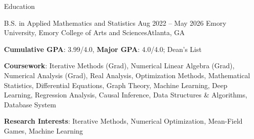 \documentclass[10pt, letterpaper]{resume} %
\begin{document}
 
\begin{rSection}{Education}
\begin{rSubsection}
	{B.S. in Applied Mathematics and Statistics}
	{Aug 2022 -- May 2026}
	{Emory University, Emory College of Arts and Sciences}{Atlanta, GA}
	
	\item \textbf{Cumulative GPA}: 3.99/4.0, \textbf{Major GPA}: 4.0/4.0; Dean's List
	\item \textbf{Coursework}: Iterative Methods (Grad), Numerical Linear Algebra (Grad), Numerical Analysis (Grad), Real Analysis, Optimization Methods, Mathematical Statistics, Differential Equations, Graph Theory, Machine Learning, Deep Learning, Regression Analysis, Causal Inference, Data Structures \& Algorithms, Database System
	\item \textbf{Research Interests}: Iterative Methods, Numerical Optimization, Mean-Field Games, Machine Learning
\end{rSubsection}
\end{rSection} 
\end{document}
